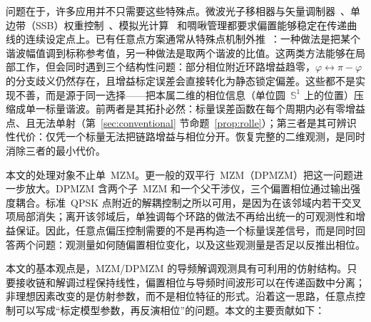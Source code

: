\documentclass[11pt,journal,onecolumn]{IEEEtran}
\theoremstyle{plain}
\theoremstyle{remark}
\begin{document}
问题在于，许多应用并不只需要这些特殊点。微波光子移相器与矢量调制器~\cite{yao2009,capmany2007}、单边带（SSB）权重控制~\cite{izutsu1981}、模拟光计算~\cite{shen2017} 和啁啾管理都要求偏置能够稳定在传递曲线的连续设定点上。已有任意点方案通常从特殊点机制外推~\cite{wang2010,yuan2019,peng2025}：一种做法是把某个谐波幅值调到标称参考值，另一种做法是取两个谐波的比值。这两类方法能够在局部工作，但会同时遇到三个结构性问题：部分相位附近环路增益趋零，$\varphi\leftrightarrow\pi-\varphi$ 的分支歧义仍然存在，且增益标定误差会直接转化为静态锁定偏差。这些都不是实现不善，而是源于同一选择——把本属二维的相位信息（单位圆~$\mathbb{S}^1$ 上的位置）压缩成单一标量谐波。前两者是其拓扑必然：标量误差函数在每个周期内必有零增益点、且无法单射（第~\ref{sec:conventional} 节命题~\ref{prop:rolle}）；第三者是其可辨识性代价：仅凭一个标量无法把链路增益与相位分开。恢复完整的二维观测，是同时消除三者的最小代价。

本文的处理对象不止单~MZM。更一般的双平行~MZM（DPMZM）把这一问题进一步放大。DPMZM 含两个子~MZM 和一个父干涉仪，三个偏置相位通过输出强度耦合。标准~QPSK 点附近的解耦控制之所以可用，是因为在该邻域内若干交叉项局部消失；离开该邻域后，单独调每个环路的做法不再给出统一的可观测性和增益保证。因此，任意点偏压控制需要的不是再构造一个标量误差信号，而是同时回答两个问题：观测量如何随偏置相位变化，以及这些观测量是否足以反推出相位。

本文的基本观点是，MZM/DPMZM 的导频解调观测具有可利用的仿射结构。只要接收链和解调过程保持线性，偏置相位与导频时间波形可以在传递函数中分离；非理想因素改变的是仿射参数，而不是相位特征的形式。沿着这一思路，任意点控制可以写成“标定模型参数，再反演相位”的问题。本文的主要贡献如下：
\end{document}
